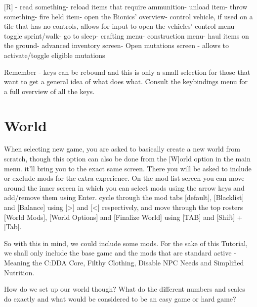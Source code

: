 \documentclass[11pt]{report}
\begin{document}
[R] - read something\newline
[r] - reload items that require ammunition\newline
[U] - unload item\newline
[t] - throw something\newline
[f] - fire held item\newline
[p] - open the Bionics' overview\newline
[\^] - control vehicle, if used on a tile that has no controls, allows for input to open the vehicles' control menu\newline
["] - toggle sprint/walk\newline
[\$] - go to sleep\newline
[\&] - crafting menu\newline
[*] - construction menu\newline
[\textbackslash] - haul items on the ground\newline
[/] - advanced inventory screen\newline
[[] - Open mutations screen - allows to activate/toggle eligible mutations
 
Remember - keys can be rebound and this is only a small selection for those that want to get a general idea of what does what. Consult the keybindings menu for a full overview of all the keys. 

\chapter{World}

When selecting new game, you are asked to basically create a new world from scratch, though this option can also be done from the [W]orld option in the main menu. it'll bring you to the exact same screen. There you will be asked to include or exclude mods for the extra experience.
On the mod list screen you can move around the inner screen in which you can select mods using the arrow keys and add/remove them using Enter. cycle through the mod tabs [default], [Blacklist] and [Balance] using [>] and [<] respectively, and move through the top rosters [World Mods], [World Options] and [Finalize World] using [TAB] and [Shift] + [Tab].

So with this in mind, we could include some mods. For the sake of this Tutorial, we shall only include the base game and the mods that are standard active - Meaning the C:DDA Core, Filthy Clothing, Disable NPC Needs and Simplified Nutrition.

How do we set up our world though? What do the different numbers and scales do exactly and what would be considered to be an easy game or hard game?
\end{document}

